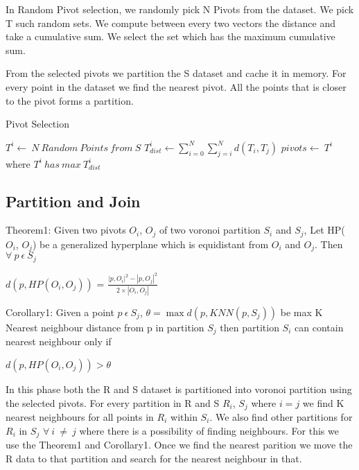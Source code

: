 \documentclass[conference]{IEEEtran}
\begin{document}
In Random Pivot selection, we randomly pick N Pivots from the
dataset. We pick T such random sets. We compute between every two
vectors the distance and take a cumulative sum. We select the set
which has the maximum cumulative sum.

From the selected pivots we partition the S dataset and cache it in
memory. For every point in the dataset we find the nearest pivot. All
the points that is closer to the pivot forms a partition.

\begin{algorithm}
\caption{Pivot Selection}
\label{algo_pivot_selection}
\begin{algorithmic}[1]
\STATE $T^i  \leftarrow \ N\ Random\ Points\ from\ S$
\STATE $T_{dist}^i \leftarrow \sum\limits_{i=0}^N\sum\limits_{j=i}^N d(T_i, T_j)$
\ENDFOR
\STATE $pivots \leftarrow\ T^i$ where $T^i\ has\ max\ T^i_{dist}$
\end{algorithmic}
\end{algorithm}

\subsection{Partition and Join}

\bigskip

Theorem1: \cite{lu_efficient_2012} Given two pivots $O_i$, $O_j$ of two voronoi
partition $S_i$ and $S_j$, Let HP($O_i$, $O_j$) be a generalized
hyperplane which is equidistant from $O_i$ and $O_j$. Then $\forall\ p\
\epsilon\ S_j$

\medskip

$d(p, HP(O_i, O_j))$ = $\frac{|p,O_i|^2 - |p,O_j|^2}{2 \times |O_i, O_j|}$

\bigskip

Corollary1: Given a point $p\ \epsilon\ S_j$, $\theta = \max{d(p, KNN(p, S_j))}$ be max K Nearest
neighbour distance from p in partition $S_j$ then partition
$S_i$ can contain nearest neighbour only if

\medskip

$d(p, HP(O_i, O_j)) > \theta $

\medskip

In this phase both the R and S dataset is partitioned into voronoi
partition using the selected pivots. For every partition in R and S $R_i$,
$S_j$ where $i=j$ we find K nearest neighbours for all points in
$R_i$ within $S_i$. We also find other partitions for $R_i$ in $S_j$
$\forall\ i\ \neq\ j$ where there is a possibility of finding
neighbours. For this we use the Theorem1 and Corollary1.
Once we find the nearest parition we move the R data to that partition
and search for the nearest neighbour in that.
\end{document}
